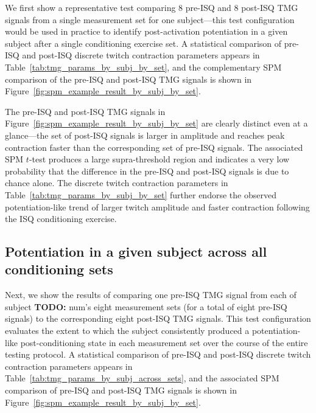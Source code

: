 \documentclass[utf8]{FrontiersinHarvard}
\newcommand{\TODO}[1]{{\textbf{TODO:} {\color{red} #1}}}
\begin{document}
We first show a representative test comparing 8 pre-ISQ and 8 post-ISQ TMG signals from a single measurement set for one subject---this test configuration would be used in practice to identify post-activation potentiation in a given subject after a single conditioning exercise set.
A statistical comparison of pre-ISQ and post-ISQ discrete twitch contraction parameters appears in Table~\ref{tab:tmg_params_by_subj_by_set},
and the complementary SPM comparison of the pre-ISQ and post-ISQ TMG signals is shown in Figure~\ref{fig:spm_example_result_by_subj_by_set}.

The pre-ISQ and post-ISQ TMG signals in Figure~\ref{fig:spm_example_result_by_subj_by_set} are clearly distinct even at a glance---the set of post-ISQ signals is larger in amplitude and reaches peak contraction faster than the corresponding set of pre-ISQ signals.
The associated SPM $ t $-test produces a large supra-threshold region and indicates a very low probability that the difference in the pre-ISQ and post-ISQ signals is due to chance alone.
The discrete twitch contraction parameters in Table~\ref{tab:tmg_params_by_subj_by_set} further endorse the observed potentiation-like trend of larger twitch amplitude and faster contraction following the ISQ conditioning exercise.

\begin{table}
    \centering
    \caption{A statistical comparison of pre- and post-ISQ TMG parameters from subject \TODO{number}'s measurement set 1.
    The twitch contraction parameters in each row were defined in Section~\ref{sss:discrete_twitch_params}.
    The columns $ \mu_{\mathrm{pre}} $ and $ \mu_{\mathrm{post}} $ show the mean value of each parameter across all eight measurements in the set, and $ \sigma_{\mathrm{pre}} $ and $ \sigma_{\mathrm{post}} $ show the corresponding standard deviations.
    The $ \lvert t \rvert $ column shows the $ t $-statistic from a paired, two-tailed Student's $ t $-test comparing the (pre-ISQ, post-ISQ) pairs for each parameter, and the $ p $ column shows the associated $ p $ value.}
    \vspace{1ex}
    \renewcommand{\arraystretch}{1.2}
    
    \label{tab:tmg_params_by_subj_by_set}
\end{table}

\subsection{Potentiation in a given subject across all conditioning sets}
Next, we show the results of comparing one pre-ISQ TMG signal from each of subject \TODO{num}'s eight measurement sets (for a total of eight pre-ISQ signals) to the corresponding eight post-ISQ TMG signals.
This test configuration evaluates the extent to which the subject consistently produced a potentiation-like post-conditioning state in each measurement set over the course of the entire testing protocol.
A statistical comparison of pre-ISQ and post-ISQ discrete twitch contraction parameters appears in Table~\ref{tab:tmg_params_by_subj_across_sets},
and the associated SPM comparison of pre-ISQ and post-ISQ TMG signals is shown in Figure~\ref{fig:spm_example_result_by_subj_by_set}.
\end{document}
